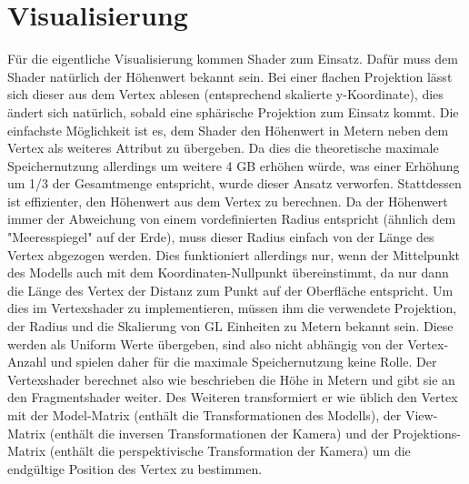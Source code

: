 \section{Visualisierung}
Für die eigentliche Visualisierung kommen Shader zum Einsatz. Dafür muss dem Shader natürlich der Höhenwert bekannt sein. Bei einer flachen Projektion lässt sich dieser aus dem Vertex ablesen (entsprechend skalierte y-Koordinate), dies ändert sich natürlich, sobald eine sphärische Projektion zum Einsatz kommt. Die einfachste Möglichkeit ist es, dem Shader den Höhenwert in Metern neben dem Vertex als weiteres Attribut zu übergeben. Da dies die theoretische maximale Speichernutzung allerdings um weitere 4 GB erhöhen würde, was einer Erhöhung um 1/3 der Gesamtmenge entspricht, wurde dieser Ansatz verworfen. Stattdessen ist effizienter, den Höhenwert aus dem Vertex zu berechnen. Da der Höhenwert immer der Abweichung von einem vordefinierten Radius entspricht (ähnlich dem "Meeresspiegel" auf der Erde), muss dieser Radius einfach von der Länge des Vertex abgezogen werden. Dies funktioniert allerdings nur, wenn der Mittelpunkt des Modells auch mit dem Koordinaten-Nullpunkt übereinstimmt, da nur dann die Länge des Vertex der Distanz zum Punkt auf der Oberfläche entspricht. Um dies im Vertexshader zu implementieren, müssen ihm die verwendete Projektion, der Radius und die Skalierung von GL Einheiten zu Metern bekannt sein. Diese werden als Uniform Werte übergeben, sind also nicht abhängig von der Vertex-Anzahl und spielen daher für die maximale Speichernutzung keine Rolle. Der Vertexshader berechnet also wie beschrieben die Höhe in Metern und gibt sie an den Fragmentshader weiter. Des Weiteren transformiert er wie üblich den Vertex mit der Model-Matrix (enthält die Transformationen des Modells), der View-Matrix (enthält die inversen Transformationen der Kamera) und der Projektions-Matrix (enthält die perspektivische Transformation der Kamera) um die endgültige Position des Vertex zu bestimmen.

